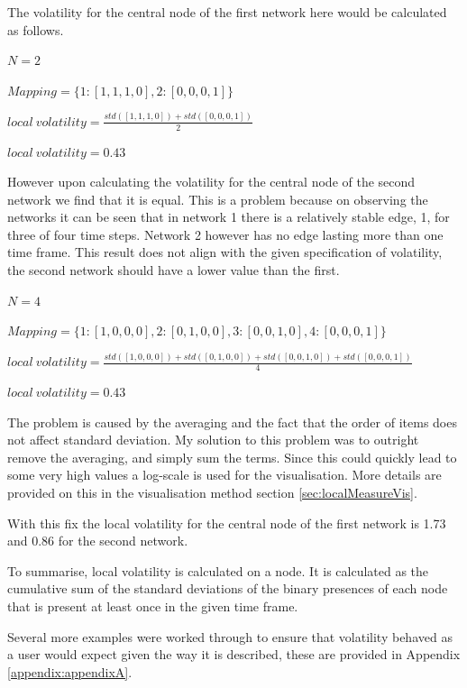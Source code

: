 The volatility for the central node of the first network here would be calculated as follows.

\begin{center}
$N = 2$

$Mapping = \{1:[1, 1, 1, 0], 2:[0, 0, 0, 1]\}$

$local\ volatility = \frac{std([1,1,1,0]) + std([0,0,0,1])}{2}$

$local\ volatility = 0.43$
\end{center}

However upon calculating the volatility for the central node of the second network we find that it is equal. This is a problem because on observing the networks it can be seen that in network 1 there is a relatively stable edge, 1, for three of four time steps. Network 2 however has no edge lasting more than one time frame. This result does not align with the given specification of volatility, the second network should have a lower value than the first.

\begin{center}
$N = 4$

$Mapping = \{1:[1, 0, 0, 0], 2:[0, 1, 0, 0], 3: [0, 0, 1, 0], 4: [0, 0, 0, 1]\}$

$local\ volatility = \frac{std([1,0,0,0]) + std([0,1,0,0]) + std([0,0,1,0]) + std([0,0,0,1])}{4}$

$local\ volatility = 0.43$
\end{center}

The problem is caused by the averaging and the fact that the order of items does not affect standard deviation. My solution to this problem was to outright remove the averaging, and simply sum the terms. Since this could quickly lead to some very high values a log-scale is used for the visualisation. More details are provided on this in the visualisation method section \ref{sec:localMeasureVis}.  

With this fix the local volatility for the central node of the first network is 1.73 and 0.86 for the second network. 

To summarise, local volatility is calculated on a node. It is calculated as the cumulative sum of the standard deviations of the binary presences of each node that is present at least once in the given time frame.

Several more examples were worked through to ensure that volatility behaved as a user would expect given the way it is described, these are provided in Appendix \ref{appendix:appendixA}.

